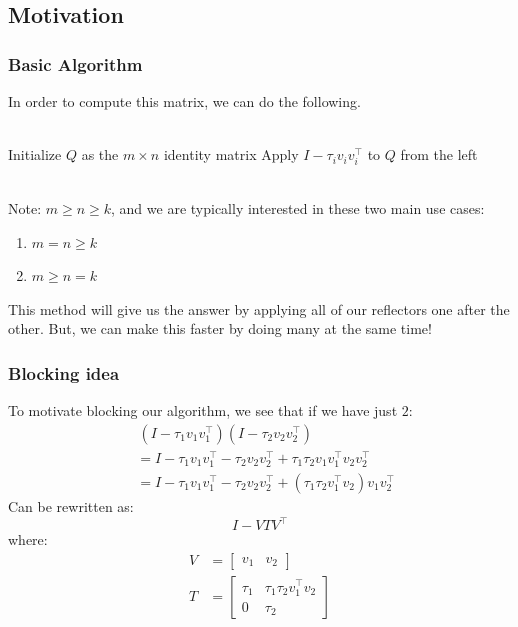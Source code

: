 \documentclass[12pt,aspectratio=169]{beamer}
\begin{document}
    \subsection{Motivation}
    \begin{frame}
        \frametitle{Basic Algorithm}
            In order to compute this matrix, we can do the following.\\\,\\
        \begin{algorithmic}[1]
            \State Initialize $Q$ as the $m\times n$ identity matrix
            \State Apply $I-\tau_iv_iv_i^\top$ to $Q$ from the left
            \EndFor
        \end{algorithmic}\,\\
        Note: $m \geq n \geq k$, and we are typically interested in these two main use cases:
        \begin{enumerate}
            \item $m=n \geq k$
            \item $m\geq n=k$
        \end{enumerate}
        This method will give us the answer by applying all of our reflectors one after the other. But, we can make this 
        faster by doing many at the same time!
    \end{frame}
    \begin{frame}
        \frametitle{Blocking idea}
        To motivate blocking our algorithm, we see that if we have just $2$:
        \begin{align*}
            &\,\left(I - \tau_1 v_1v_1^\top\right)\left(I - \tau_2 v_2v_2^\top\right) \\
            &= I - \tau_1v_1v_1^\top - \tau_2v_2v_2^\top + \tau_1\tau_2v_1v_1^\top v_2v_2^\top \\
            &= I - \tau_1v_1v_1^\top - \tau_2v_2v_2^\top + \left(\tau_1\tau_2v_1^\top v_2\right)v_1v_2^\top
        \end{align*}
        Can be rewritten as:
        $$
            I - VTV^\top
        $$
        where:
        \begin{align*}
            V &= \begin{bmatrix}
                v_1 & v_2
            \end{bmatrix}\\
            T &= \begin{bmatrix}
                \tau_1 & \tau_1\tau_2v_1^\top v_2 \\
                0       & \tau_2
            \end{bmatrix}
        \end{align*}
    \end{frame}
\end{document}
